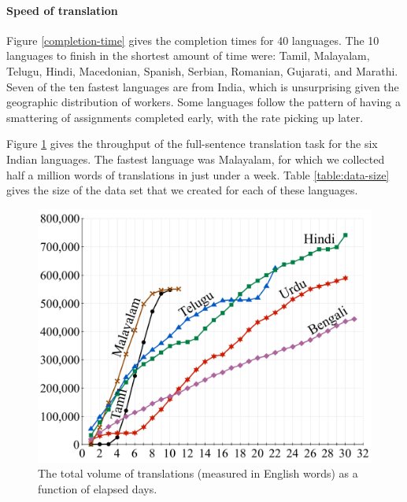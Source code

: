 \documentclass[11pt]{article}
\begin{document}
\paragraph{Speed of translation}


Figure \ref{completion-time} gives the completion times for 40 languages.  
The 10 languages to finish in the shortest amount of time were: Tamil, Malayalam, Telugu, Hindi, Macedonian, Spanish, Serbian, Romanian, Gujarati, and Marathi. Seven of the ten fastest languages are from India, which is unsurprising given the geographic distribution of workers.  Some languages follow the pattern of having a smattering of assignments completed early, with the rate picking up later. 

Figure \ref{figure:volume-of-data-by-language} gives the throughput of the full-sentence translation task for the six Indian languages.  The fastest language was Malayalam, for which we collected half a million words of translations in just under a week.  Table \ref{table:data-size} gives the size of the data set that we created for each of these languages. 

\begin{figure}[t]
  \includegraphics[width=\linewidth]{figures/volume}
  \caption{The total volume of translations (measured in English words)
    as a function of elapsed days. }
  \label{figure:volume-of-data-by-language}
\end{figure}
\end{document}
